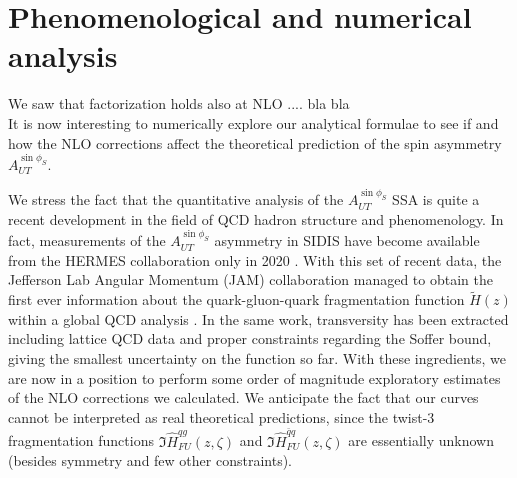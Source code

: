 
\chapter{Phenomenological and numerical analysis}\label{chap:numerics}
We saw that factorization holds also at NLO .... bla bla\\
It is now interesting to numerically explore our analytical formulae to see if and how the NLO corrections affect the theoretical prediction of the spin asymmetry $A_{UT}^{\sin\phi_S}$. 

We stress the fact that the quantitative analysis of the $A_{UT}^{\sin\phi_S}$ SSA is quite a recent development in the field of QCD hadron structure and phenomenology. In fact, measurements of the $A_{UT}^{\sin\phi_S}$ asymmetry in SIDIS have become available from the HERMES collaboration only in 2020 \cite{hermescollaboration2020azimuthalsingledoublespinasymmetries}. With this set of recent data, the Jefferson Lab Angular Momentum (JAM) collaboration managed to obtain the first ever information about the quark-gluon-quark fragmentation function $\tilde{H}(z) $ within a global QCD analysis \cite{Gamberg2022Htilde}. In the same work, transversity has been extracted including lattice QCD data and proper constraints regarding the Soffer bound, giving the smallest uncertainty on the function so far. With these ingredients, we are now in a position to perform some order of magnitude exploratory estimates of the NLO corrections we calculated. We anticipate the fact that our curves cannot be interpreted as real theoretical predictions, since the twist-3 fragmentation functions $\Im\hat{H}_{FU}^{qg}(z,\zeta)$ and $\Im\hat{H}_{FU}^{\bar{q}q}(z,\zeta)$ are essentially unknown (besides symmetry and few other constraints).

